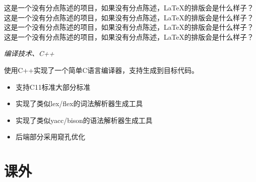 \documentclass{uniquecv}
\begin{document}
这是一个没有分点陈述的项目，如果没有分点陈述，LaTeX的排版会是什么样子？
这是一个没有分点陈述的项目，如果没有分点陈述，LaTeX的排版会是什么样子？
这是一个没有分点陈述的项目，如果没有分点陈述，LaTeX的排版会是什么样子？
这是一个没有分点陈述的项目，如果没有分点陈述，LaTeX的排版会是什么样子？

\textit{编译技术、C++}
\vspace{0.4ex}

使用C++实现了一个简单C语言编译器，支持生成到目标代码。
\begin{itemize}
  \item 支持C11标准大部分标准
  \item 实现了类似lex/flex的词法解析器生成工具
  \item 实现了类似yacc/bison的语法解析器生成工具
  \item 后端部分采用窥孔优化
\end{itemize}



\section{课外}
\end{document}
